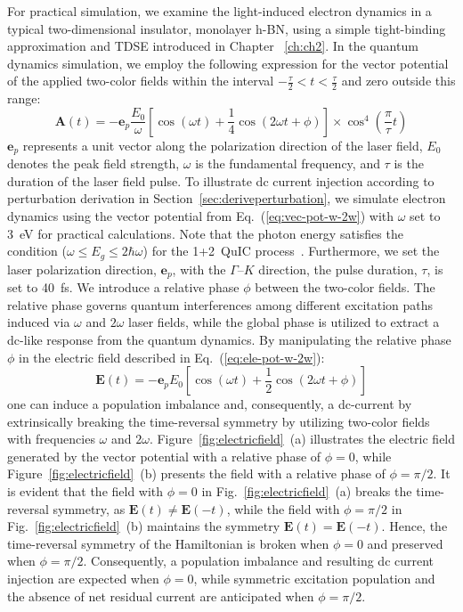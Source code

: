  For practical simulation, we examine the light-induced electron dynamics in a typical two-dimensional insulator, monolayer \gls{h-BN}, using a simple tight-binding approximation and \gls{TDSE} introduced in Chapter ~\ref{ch:ch2}. In the quantum dynamics simulation, we employ the following expression for the vector potential of the applied two-color fields within the interval $-\frac{\tau}{2} < t < \frac{\tau}{2}$ and zero outside this range:
\begin{equation}
\mathbf{A}(t) = -\mathbf{e}_p \frac{E_0}{\omega} \left [
\cos \left (\omega t \right ) + \frac{1}{4}\cos
\left (2\omega t + \phi \right )
\right ] \times \cos^4 \left (\frac{\pi}{\tau}t \right )
\end{equation}
$\mathbf{e}_p$ represents a unit vector along the polarization direction of the laser field, $E_0$ denotes the peak field strength, $\omega$ is the fundamental frequency, and $\tau$ is the duration of the laser field pulse. 
To illustrate dc current injection according to perturbation derivation in Section~\ref{sec:deriveperturbation}, we simulate electron dynamics using the vector potential from Eq.~(\ref{eq:vec-pot-w-2w}) with $\omega$ set to 3~eV for practical calculations. Note that the photon energy satisfies the condition ($\omega \le E_g \le 2\hbar \omega$) for the 1+2~\gls{QuIC} process~\cite{PhysRevLett.76.1703}. Furthermore,  we set the laser polarization direction, $\mathbf e_{p}$, with the $\Gamma$--$K$ direction, the pulse duration, $\tau$, is set to 40~fs.
We introduce a relative phase $\phi$ between the two-color fields. The relative phase governs quantum interferences among different excitation paths induced via $\omega$ and $2\omega$ laser fields, while the global phase is utilized to extract a dc-like response from the quantum dynamics.
By manipulating the relative phase $\phi$ in the electric field described in Eq.~(\ref{eq:ele-pot-w-2w}):
\begin{equation}
\mathbf{E}(t) =-\mathbf{e}_p {E_0} \left [
\cos \left (\omega t \right ) + \frac{1}{2}\cos
\left (2\omega t + \phi \right )
\right ] \nonumber
\label{eq:ele-pot-w-2w}
\end{equation}
one can induce a population imbalance and, consequently, a dc-current by extrinsically breaking the time-reversal symmetry by utilizing two-color fields with frequencies $\omega$ and $2\omega$. Figure~\ref{fig:electricfield}~(a) illustrates the electric field generated by the vector potential with a relative phase of $\phi=0$, while Figure~\ref{fig:electricfield}~(b) presents the field with a relative phase of $\phi=\pi/2$. It is evident that the field with $\phi=0$ in Fig.~\ref{fig:electricfield}~(a) breaks the time-reversal symmetry, as $\mathbf{E}(t) \neq \mathbf{E}(-t)$, while the field with $\phi=\pi/2$ in Fig.~\ref{fig:electricfield}~(b) maintains the symmetry $\mathbf{E}(t)=\mathbf{E}(-t)$. Hence, the time-reversal symmetry of the Hamiltonian is broken when $\phi=0$ and preserved when $\phi=\pi/2$. Consequently, a population imbalance and resulting dc current injection are expected when $\phi=0$, while symmetric excitation population and the absence of net residual current are anticipated when $\phi=\pi/2$.

